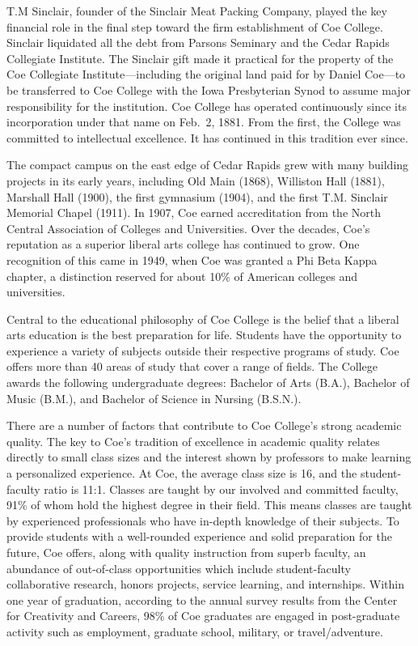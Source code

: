\documentclass[
  letterpaper,
]{scrbook}
\begin{document}
T.M Sinclair, founder of the Sinclair Meat Packing Company, played the
key financial role in the final step toward the firm establishment of
Coe College. Sinclair liquidated all the debt from Parsons Seminary and
the Cedar Rapids Collegiate Institute. The Sinclair gift made it
practical for the property of the Coe Collegiate Institute---including
the original land paid for by Daniel Coe---to be transferred to Coe
College with the Iowa Presbyterian Synod to assume major responsibility
for the institution. Coe College has operated continuously since its
incorporation under that name on Feb.~2, 1881. From the first, the
College was committed to intellectual excellence. It has continued in
this tradition ever since.

The compact campus on the east edge of Cedar Rapids grew with many
building projects in its early years, including Old Main (1868),
Williston Hall (1881), Marshall Hall (1900), the first gymnasium (1904),
and the first T.M. Sinclair Memorial Chapel (1911). In 1907, Coe earned
accreditation from the North Central Association of Colleges and
Universities. Over the decades, Coe's reputation as a superior liberal
arts college has continued to grow. One recognition of this came in
1949, when Coe was granted a Phi Beta Kappa chapter, a distinction
reserved for about 10\% of American colleges and universities.

Central to the educational philosophy of Coe College is the belief that
a liberal arts education is the best preparation for life. Students have
the opportunity to experience a variety of subjects outside their
respective programs of study. Coe offers more than 40 areas of study
that cover a range of fields. The College awards the following
undergraduate degrees: Bachelor of Arts (B.A.), Bachelor of Music
(B.M.), and Bachelor of Science in Nursing (B.S.N.).

There are a number of factors that contribute to Coe College's strong
academic quality. The key to Coe's tradition of excellence in academic
quality relates directly to small class sizes and the interest shown by
professors to make learning a personalized experience. At Coe, the
average class size is 16, and the student-faculty ratio is 11:1. Classes
are taught by our involved and committed faculty, 91\% of whom hold the
highest degree in their field. This means classes are taught by
experienced professionals who have in-depth knowledge of their subjects.
To provide students with a well-rounded experience and solid preparation
for the future, Coe offers, along with quality instruction from superb
faculty, an abundance of out-of-class opportunities which include
student-faculty collaborative research, honors projects, service
learning, and internships. Within one year of graduation, according to
the annual survey results from the Center for Creativity and Careers,
98\% of Coe graduates are engaged in post-graduate activity such as
employment, graduate school, military, or travel/adventure.
\end{document}

